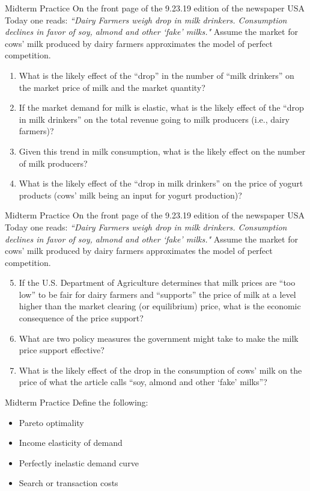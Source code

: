 \documentclass{beamer}
\begin{document}
\begin{frame}{Midterm Practice}
On the front page of the 9.23.19 edition of the newspaper USA Today one reads: \textit{``Dairy Farmers weigh drop in milk drinkers. Consumption declines in favor of soy, almond and other ‘fake’ milks."}  Assume the market for cows’ milk produced by dairy farmers approximates the model of perfect competition. 
\begin{enumerate}
\item What is the likely effect of the “drop” in the number of “milk drinkers” on the market price of milk and the market quantity?
\item If the market demand for milk is elastic, what is the likely effect of the “drop in milk drinkers” on the total revenue going to milk producers (i.e., dairy farmers)?
\item Given this trend in milk consumption, what is the likely effect on the number of milk producers?
\item What is the likely effect of the “drop in milk drinkers” on the price of yogurt products (cows’ milk being an input for yogurt production)?
\end{enumerate}
\end{frame}

\begin{frame}{Midterm Practice}
On the front page of the 9.23.19 edition of the newspaper USA Today one reads: \textit{``Dairy Farmers weigh drop in milk drinkers. Consumption declines in favor of soy, almond and other ‘fake’ milks."}  Assume the market for cows’ milk produced by dairy farmers approximates the model of perfect competition. 
\begin{enumerate}
\setcounter{enumi}{4}
\item If the U.S. Department of Agriculture determines that milk prices are “too low” to be fair for dairy farmers and “supports” the price of milk at a level higher than the market clearing (or equilibrium) price, what is the economic consequence of the price support?
\item What are two policy measures the government might take to make the milk price support effective?
\item What is the likely effect of the drop in the consumption of cows’ milk on the price of what the article calls “soy, almond and other ‘fake’ milks”?
\end{enumerate}
\end{frame}

\begin{frame}{Midterm Practice}
Define the following:
\begin{itemize}
\item Pareto optimality
\item Income elasticity of demand
\item Perfectly  inelastic demand curve
\item Search or transaction costs
\end{itemize}
\end{frame}
\end{document}
